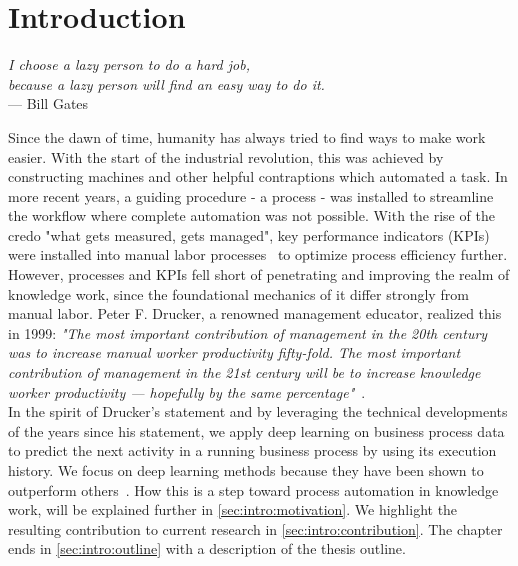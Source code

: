 \chapter{Introduction}\label{sec:intro}
\begin{flushright}{\slshape
I choose a lazy person to do a hard job,\\
because a lazy person will find an easy way to do it.}\\
\medskip
--- Bill Gates
\end{flushright}

\noindent Since the dawn of time, humanity has always tried to find ways to make work easier. With the start of the industrial revolution, this was achieved by constructing machines and other helpful contraptions which automated a task. In more recent years, a guiding procedure - a process - was installed to streamline the workflow where complete automation was not possible. With the rise of the credo "what gets measured, gets managed", key performance indicators (KPIs) were installed into manual labor processes~\cite{web:taylorism-and-drucker} to optimize process efficiency further.\\

However, processes and KPIs fell short of penetrating and improving the realm of knowledge work, since the foundational mechanics of it differ strongly from manual labor. Peter F. Drucker, a renowned management educator, realized this in 1999:
{\slshape"The most important contribution of management in the 20th century was to increase manual worker productivity fifty-fold. The most important contribution of management in the 21st century will be to increase knowledge worker productivity — hopefully by the same percentage"}~\cite{drucker1999}.\\

In the spirit of Drucker's statement and by leveraging the technical developments of the years since his statement, we apply deep learning on business process data to predict the next activity in a running business process by using its execution history. We focus on deep learning methods because they have been shown to outperform others~\cite{tax2018interdisciplinary}. How this is a step toward process automation in knowledge work, will be explained further in \autoref{sec:intro:motivation}.  We highlight the resulting contribution to current research in \autoref{sec:intro:contribution}. The chapter ends in \autoref{sec:intro:outline} with a description of the thesis outline.

